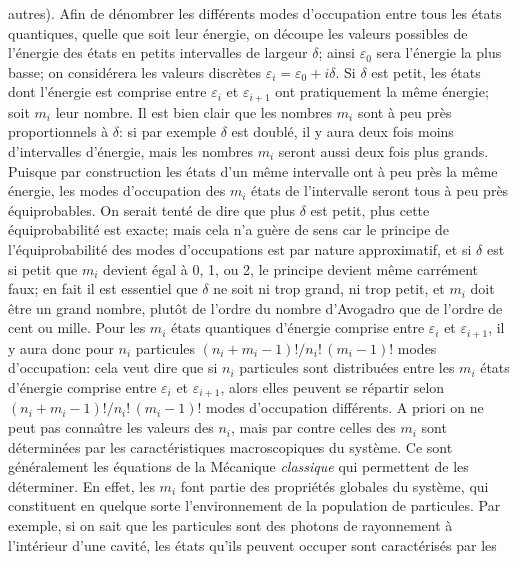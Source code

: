 autres). 
\medskip 
Afin de d\'enombrer les diff\'erents modes d'occupation entre tous les 
\'etats quantiques, quelle que soit leur \'energie, on d\'ecoupe les  
valeurs possibles de l'\'energie des \'etats en petits intervalles de 
largeur  $\delta$; ainsi $\varepsilon_0$ sera l'\'energie la plus basse;  
on consid\'erera les valeurs discr\`etes $\varepsilon_i = \varepsilon_0 
+ i \delta$. Si $\delta$ est petit, les \'etats dont l'\'energie est 
comprise entre $\varepsilon_i$ et $\varepsilon_{i+1}$ ont pratiquement 
la m\^eme \'energie; soit $m_i$ leur nombre. Il est bien clair que les  
nombres $m_i$ sont \`a peu pr\`es proportionnels \`a $\delta$: si par 
exemple $\delta$ est doubl\'e, il y aura deux fois moins d'intervalles 
d'\'energie, mais les nombres $m_i$ seront aussi deux fois plus grands.  
Puisque par construction les \'etats d'un m\^eme intervalle ont \`a peu  
pr\`es la m\^eme \'energie, les modes d'occupation des $m_i$ \'etats de  
l'intervalle seront tous \`a peu pr\`es \'equiprobables. On serait tent\'e de 
dire que plus $\delta$ est petit, plus cette \'equiprobabilit\'e est  exacte; 
mais cela n'a gu\`ere de sens car le principe de l'\'equiprobabilit\'e des 
modes d'occupations est par nature approximatif, et si $\delta$ est si 
petit que $m_i$ devient \'egal \`a 0, 1, ou 2, le principe devient m\^eme 
carr\'ement faux; en fait il est essentiel que $\delta$ ne soit ni trop 
grand, ni trop petit, et $m_i$ doit \^etre un grand nombre, plut\^ot de 
l'ordre du nombre d'Avogadro que de l'ordre de cent ou mille.   
\medskip  
Pour les $m_i$ \'etats quantiques d'\'energie comprise entre  
$\varepsilon_i$ et $\varepsilon_{i+1}$, il y aura donc pour $n_i$   
particules $(n_i + m_i -1)!  \bigl/ n_i!\, (m_i-1)!$ modes d'occupation: 
cela veut dire que si $n_i$  particules sont distribu\'ees entre les $m_i$ 
\'etats d'\'energie  comprise entre $\varepsilon_i$ et $\varepsilon_{i+1}$, 
alors elles peuvent se r\'epartir selon $(n_i + m_i -1)! \bigl/ n_i!\, 
(m_i-1)!$  modes d'occupation diff\'erents. A priori on ne peut pas 
conna\^\i tre les  valeurs des $n_i$, mais par contre celles des $m_i$ sont 
d\'etermin\'ees par les caract\'eristiques macroscopiques du syst\`eme. 
Ce sont g\'en\'eralement les \'equations de la M\'ecanique {\it classique} 
qui permettent de les d\'eterminer. En effet, les $m_i$ font partie des 
propri\'et\'es globales du syst\`eme, qui constituent en quelque sorte 
l'environnement de la population de particules. Par exemple, si on sait  
que les particules sont des photons de rayonnement \`a l'int\'erieur d'une 
cavit\'e, les \'etats qu'ils peuvent occuper sont caract\'eris\'es par les 
